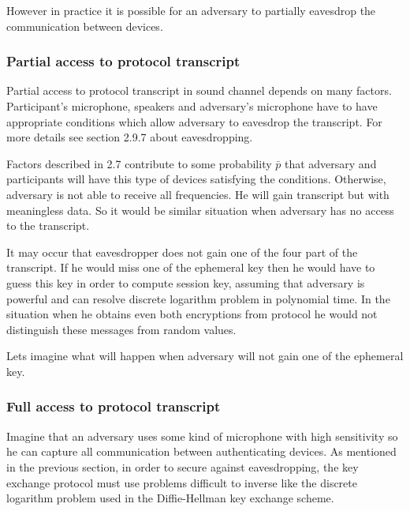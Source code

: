 \documentclass[11pt,titlepage]{article}
\theoremstyle{plain}
\begin{document}
However in practice it is possible for an adversary to partially eavesdrop the communication between devices.

\subsubsection{Partial access to protocol transcript}

Partial access to protocol transcript in sound channel depends on many factors. Participant's microphone, speakers and adversary's microphone have to have appropriate conditions which allow adversary to eavesdrop the transcript. For more details see section 2.9.7 about eavesdropping.

\vspace{5mm}

Factors described in 2.7 contribute to some probability $\bar{p}$ that adversary and participants will have this type of devices satisfying the conditions. Otherwise, adversary is not able to receive all frequencies. He will gain transcript but with meaningless data. So it would be similar situation when adversary has no access to the transcript.  

\vspace{5mm}

It may occur that eavesdropper does not gain one of the four part of the transcript. If he would miss one of the ephemeral key then he would have to guess this key in order to compute session key, assuming that adversary is powerful and can resolve discrete logarithm problem in polynomial time. In the situation when he obtains even both encryptions from protocol he would not distinguish these messages from random values. 

\vspace{5mm}

Lets imagine what will happen when adversary will not gain one of the ephemeral key.
\subsubsection{Full access to protocol transcript}
Imagine that an adversary uses some kind of microphone with high sensitivity so he can capture all communication between authenticating devices. As mentioned in the previous section, in order to secure against eavesdropping, the key exchange protocol must use problems difficult to inverse like the discrete logarithm problem used in the Diffie-Hellman key exchange scheme.
\end{document}
